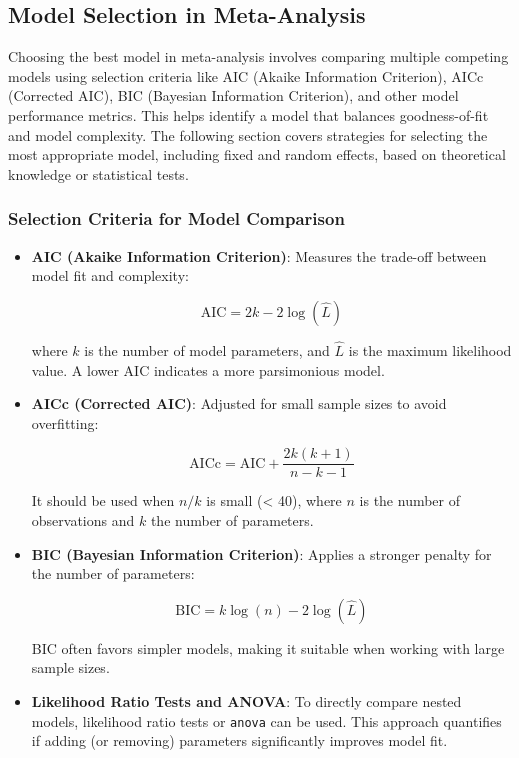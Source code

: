 \documentclass[
]{book}
\begin{document}
\subsection{Model Selection in Meta-Analysis}\label{model-selection-in-meta-analysis}

Choosing the best model in meta-analysis involves comparing multiple competing models using selection criteria like AIC (Akaike Information Criterion), AICc (Corrected AIC), BIC (Bayesian Information Criterion), and other model performance metrics. This helps identify a model that balances goodness-of-fit and model complexity. The following section covers strategies for selecting the most appropriate model, including fixed and random effects, based on theoretical knowledge or statistical tests.

\subsubsection{\texorpdfstring{\textbf{Selection Criteria for Model Comparison}}{Selection Criteria for Model Comparison}}\label{selection-criteria-for-model-comparison}

\begin{itemize}
\item
  \textbf{AIC (Akaike Information Criterion)}: Measures the trade-off between model fit and complexity:

  \[
  \text{AIC} = 2k - 2\log(\hat{L})
  \]

  where \(k\) is the number of model parameters, and \(\hat{L}\) is the maximum likelihood value. A lower AIC indicates a more parsimonious model.
\item
  \textbf{AICc (Corrected AIC)}: Adjusted for small sample sizes to avoid overfitting:

  \[
  \text{AICc} = \text{AIC} + \frac{2k(k+1)}{n - k - 1}
  \]

  It should be used when \(n/k\) is small (\textless{} 40), where \(n\) is the number of observations and \(k\) the number of parameters.
\item
  \textbf{BIC (Bayesian Information Criterion)}: Applies a stronger penalty for the number of parameters:

  \[
  \text{BIC} = k\log(n) - 2\log(\hat{L})
  \]

  BIC often favors simpler models, making it suitable when working with large sample sizes.
\item
  \textbf{Likelihood Ratio Tests and ANOVA}: To directly compare nested models, likelihood ratio tests or \texttt{anova} can be used. This approach quantifies if adding (or removing) parameters significantly improves model fit.
\end{itemize}
\end{document}
